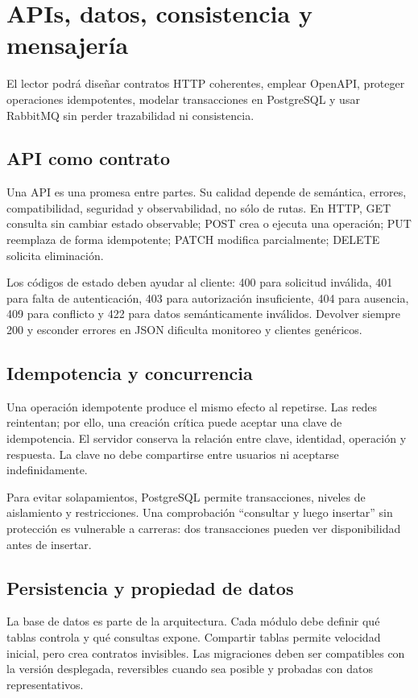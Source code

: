\chapter{APIs, datos, consistencia y mensajería}

\begin{objetivos}
El lector podrá diseñar contratos HTTP coherentes, emplear OpenAPI, proteger operaciones idempotentes, modelar transacciones en PostgreSQL y usar RabbitMQ sin perder trazabilidad ni consistencia.
\end{objetivos}

\section{API como contrato}
Una API es una promesa entre partes. Su calidad depende de semántica, errores, compatibilidad, seguridad y observabilidad, no sólo de rutas. En HTTP, GET consulta sin cambiar estado observable; POST crea o ejecuta una operación; PUT reemplaza de forma idempotente; PATCH modifica parcialmente; DELETE solicita eliminación.

Los códigos de estado deben ayudar al cliente: 400 para solicitud inválida, 401 para falta de autenticación, 403 para autorización insuficiente, 404 para ausencia, 409 para conflicto y 422 para datos semánticamente inválidos. Devolver siempre 200 y esconder errores en JSON dificulta monitoreo y clientes genéricos.

\section{Idempotencia y concurrencia}
Una operación idempotente produce el mismo efecto al repetirse. Las redes reintentan; por ello, una creación crítica puede aceptar una clave de idempotencia. El servidor conserva la relación entre clave, identidad, operación y respuesta. La clave no debe compartirse entre usuarios ni aceptarse indefinidamente.

Para evitar solapamientos, PostgreSQL permite transacciones, niveles de aislamiento y restricciones. Una comprobación ``consultar y luego insertar'' sin protección es vulnerable a carreras: dos transacciones pueden ver disponibilidad antes de insertar.

\section{Persistencia y propiedad de datos}
La base de datos es parte de la arquitectura. Cada módulo debe definir qué tablas controla y qué consultas expone. Compartir tablas permite velocidad inicial, pero crea contratos invisibles. Las migraciones deben ser compatibles con la versión desplegada, reversibles cuando sea posible y probadas con datos representativos.

